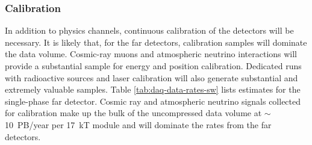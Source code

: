 \subsubsection{
Calibration}
In addition to physics channels, continuous calibration of the detectors will be necessary.  It is likely that, for the far detectors, calibration samples will  dominate the data volume. Cosmic-ray muons and atmospheric neutrino interactions will provide a substantial sample for energy and position calibration.  Dedicated runs with radioactive sources and laser calibration will also generate substantial and extremely valuable samples. Table \ref{tab:daq-data-rates-sw} lists estimates for the single-phase far detector.   Cosmic ray and atmospheric neutrino signals collected for calibration make up the bulk of the uncompressed data volume at $\sim$ 10~PB/year per 17~kT module and will dominate the rates from the far detectors.  %








%
%
%

